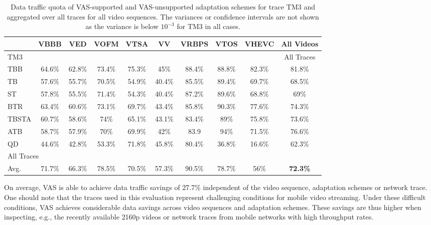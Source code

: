 \begin{table}[htb]
\centering
\caption[Data traffic quota of VAS for different adaptation schemes.]{Data traffic quota of VAS-supported and \ac{VAS}-unsupported adaptation schemes for trace TM3 and aggregated over all traces for all video sequences. The variances or confidence intervals are not shown as the variance is below $10^{-3}$ for TM3 in all cases.} 
\begin{tabular}{l|cccccccc|c}
 \toprule[2.0pt]
 & VBBB & VED & VOFM & VTSA & VV & VRBPS & VTOS & VHEVC & All Videos \\
 \hline
 \multicolumn{9}{l}{TM3} & All Traces\\
 \hline
 TBB&64.6\%&62.8\%&73.4\%&75.3\%&45\%&88.4\%&88.8\%&82.3\%&81.8\%\\
 TB&57.6\%&55.7\%&70.5\%&54.9\%&40.4\%&85.5\%&89.4\%&69.7\%&68.5\%\\
 ST&57.8\%&55.5\%&71.4\%&54.3\%&40.4\%&87.2\%&89.6\%&68.8\%&69\%\\
 BTR&63.4\%&60.6\%&73.1\%&69.7\%&43.4\%&85.8\%&90.3\%&77.6\%&74.3\%\\
 TBSTA&60.7\%&58.6\%&74\%&65.1\%&43.1\%&83.4\%&89\%&75.8\%&73.6\%\\
 ATB&58.7\%&57.9\%&70\%&69.9\%&42\%&83.9&94\%&71.5\%&76.6\%\\
 QD&44.6\%&42.8\%&53.3\%&71.8\%&45.8\%&80.4\%&36.8\%&16.6\%&62.3\%\\
 \hline
 \multicolumn{9}{l}{All Traces}&\\
 \hline
 Avg.&71.7\%&66.3\%&78.5\%&70.5\%&57.3\%&90.5\%&78.7\%&56\%&\textbf{72.3\%}\\
 \bottomrule[2.0pt]
 \end{tabular}
 \label{tab:730_trafficReduction}
\end{table}
On average, \ac{VAS} is able to achieve data traffic savings of 27.7\% independent of the video sequence, adaptation schemes or network trace.
One should note that the traces used in this evaluation represent challenging conditions for mobile video streaming.
Under these difficult conditions, \ac{VAS} achieves considerable data savings across video sequences and adaptation schemes.
These savings are thus higher when inspecting, e.g., the recently available \ac{2160p} videos or network traces from mobile networks with high throughput rates.
